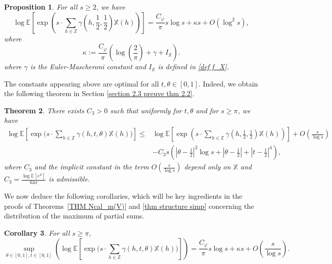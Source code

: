 \documentclass[12pt]{amsart}
\newtheorem{thm}{Theorem}[section]
\newtheorem{cor}[thm]{Corollary}
\newtheorem{pro}[thm]{Proposition}
\theoremstyle{definition}
\numberwithin{equation}{section}
\numberwithin{equation}{section}
\def\E{\mathbb{E}}
\def\Z{\mathbb{Z}}
\def\Mp{C_\varphi}
\def\X{\mathbb{X}}
\def\E{\mathbb{E}}
\begin{document}
\begin{pro}\label{pro kappa ABL21}\cite[Proposition 5.2]{ABL21} For all $s\geq 2$, we have
\begin{equation}\label{eq asymp 1/2 1/2}
\log \E \left[\exp \left(s \cdot \sum_{h\in \Z} \gamma\left(h,\frac{1}{2},\frac{1}{2}\right)\X(h)\right)\right] 
= \frac{\Mp}{\pi}s\log s+
\kappa s +O\left(\log^2 s \right),
\end{equation}
where
\begin{equation}\label{def kappa}
\kappa :=\frac{\Mp}{\pi}
\left(\log\left(\frac{2}{\pi}\right)+\gamma+ I_\X \right).
\end{equation}
where $\gamma$ is the Euler-Mascheroni constant and  $
I_\X $ is defined in \eqref{def f_X}.

\end{pro}
The constants appearing above are optimal for all $t,\theta\in [0,1]$. Indeed, we obtain the following theorem in Section \ref{section 2.3 preuve thm 2.2}.
\begin{thm}\label{THM asymp t theta} There exists $C_3>0$ such that uniformly for $t, \theta$ and for $s\geq \pi$, we have
\begin{align*}
\log \E \left[\exp \Big(s \cdot \sum_{h\in \Z}
     \gamma(h,t,\theta)\X(h)\Big) \right] 
\leq & \log \E \left[\exp \left(s \cdot \sum_{h\in \Z} \gamma\left(h,\frac{1}{2},\frac{1}{2}\right)\X(h)\right)\right] + O\left(\frac{s}{\log s}\right)\\
    & - C_3 s\left(\left|\theta-\frac{1}{2}\right|^2 \log s +\left|\theta-\frac{1}{2}\right|+ \left|t-\frac{1}{2}\right|^4\right),
\end{align*} 
where $C_3$ and the implicit constant in the term $O\left(\frac{s}{\log s}\right)$ depend only on $\X$ and $C_3=\frac{\log\E\left[e^\X\right]}{64\pi }$ is admissible.
\end{thm}
We now deduce the following corollaries, which will be key ingredients in the proofs of Theorems~\ref{THM Ncal_m(V)} and \ref{thm structure simp} concerning the distribution of the maximum of partial sums.

\begin{cor}\label{THM asymp  uniform (0,1)^2} For all $s\geq \pi $,
\begin{equation}
    \sup_{\theta \in[0,1], t\in [0,1]}\left(
\log \E \left[\exp \Big(s \cdot \sum_{h\in \Z}
     \gamma(h,t,\theta)\X(h)\Big) \right] \right) = 
     \frac{\Mp}{\pi} s \log s+\kappa s+ O\left(\frac{s}{\log s}\right).
\end{equation}

\end{cor}
\end{document}
